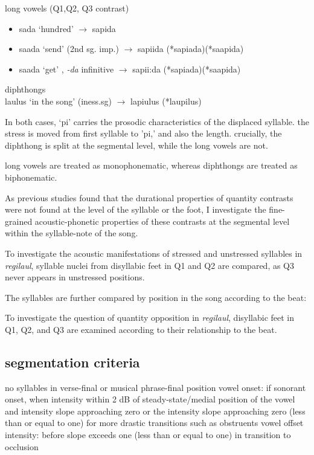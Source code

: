 \begin{exe}

\ex  long vowels (Q1,Q2, Q3 contrast) 
	\begin{itemize} 
	\item sada `hundred' $\rightarrow$ sapida 
	\item  saada `send' (2nd sg. imp.) $\rightarrow$ sapiida (*sapiada)(*saapida)
	\item saada `get' , {\it -da} infinitive $\rightarrow$ sapii:da (*sapiada)(*saapida)
	\end{itemize}
\ex 	 diphthongs \\
laulus `in the song' (iness.sg) $\rightarrow$ lapiulus (*laupilus)
\end{exe}

In both cases, `pi' carries the prosodic characteristics of the displaced syllable. the stress is moved from first syllable to 'pi,' and also the length. crucially, the diphthong is split at the segmental level, while the long vowels are not. 

long vowels are treated as monophonematic, whereas diphthongs are treated as biphonematic. 

\cite{lehiste85, vago85}

As previous studies found that the durational properties of quantity contrasts were not found at the level of the syllable or the foot, I investigate the fine-grained acoustic-phonetic properties of these contrasts at the segmental level within the syllable-note of the song. 


To investigate the acoustic manifestations of stressed and unstressed syllables in {\it regilaul}, syllable nuclei from disyllabic feet in Q1 and Q2 are compared, as Q3 never appears in unstressed positions. 
%

The syllables are further compared by position in the song according to the beat: 

To investigate the question of quantity opposition in {\it regilaul}, disyllabic feet in Q1, Q2, and Q3 are examined according to their relationship to the beat. 



\subsection{segmentation criteria}

no syllables in verse-final or musical phrase-final position
vowel onset:
if sonorant onset, when intensity within 2 dB of steady-state/medial position of the vowel and intensity slope approaching zero
or the intensity slope approaching zero (less than or equal to one) for more drastic transitions such as obstruents
vowel offset intensity: before slope exceeds one (less than or equal to one) in transition to occlusion

